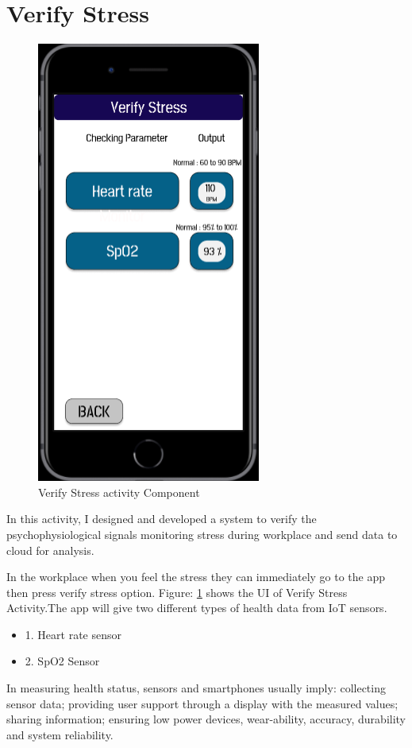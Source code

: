 \section{Verify Stress}
\begin{figure}[hbt!] 
  \centering
  \includegraphics[width=0.4\linewidth]{chap4/image4/sensor.png}
  \caption[Verify Stress activity Component ]{Verify Stress activity Component }
  \label{fig:Verify_Stress}
\end{figure}
In this activity, I designed and developed a system  to verify the psychophysiological signals monitoring stress during workplace and send data to cloud for analysis. 

In the workplace when you feel the stress they can immediately go to the app then press verify stress option. Figure: \ref{fig:Verify_Stress} shows the UI of Verify Stress Activity.The app will give two different types of health data from \acs{IoT} sensors.

\begin{itemize}
    \item 1. Heart rate sensor
    \item 2. \acf{SpO2} Sensor
\end{itemize}

In measuring health status, sensors and smartphones usually imply: collecting sensor data; providing user support through a display with the measured values; sharing information; ensuring low power devices, wear-ability, accuracy, durability and system reliability.

